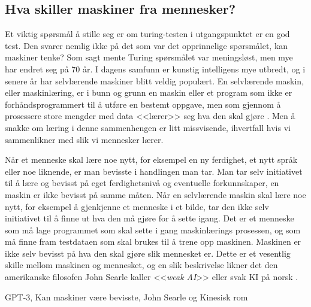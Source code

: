 \subsection{Hva skiller maskiner fra mennesker?}

Et viktig spørsmål å stille seg er om turing-testen i utgangspunktet er en god test. 
Den svarer nemlig ikke på det som var det opprinnelige spørsmålet, kan maskiner tenke? 
Som sagt mente Turing spørsmålet var meningsløst, men mye har endret seg på 70 år. 
I dagens samfunn er kunstig intelligens mye utbredt, og i senere år har selvlærende maskiner blitt veldig populært.
En selvlærende maskin, eller maskinlæring, er i bunn og grunn en maskin eller et program som ikke er forhåndsprogrammert til å utføre en bestemt oppgave, 
men som gjennom å prosessere store mengder med data <<lærer>> seg hva den skal gjøre \autocite[3]{Kiran2013}. Men å snakke om læring i denne sammenhengen er litt missvisende, ihvertfall hvis vi sammenlikner med slik vi mennesker lærer. 

Når et menneske skal lære noe nytt, for eksempel en ny ferdighet, et nytt språk eller noe liknende, er man bevisste i handlingen man tar. 
Man tar selv initiativet til å lære og bevisst på eget ferdighetsnivå og eventuelle forkunnskaper, en maskin er ikke bevisst på samme måten. 
Når en selvlærende maskin skal lære noe nytt, for eksempel å gjenkjenne et menneske i et bilde, tar den ikke selv initiativet til å finne ut hva den må gjøre for å sette igang. 
Det er et menneske som må lage programmet som skal sette i gang maskinlærings prosessen, 
og som må finne fram testdataen som skal brukes til å trene opp maskinen. 
Maskinen er ikke selv bevisst på hva den skal gjøre slik mennesket er. 
Dette er et vesentlig skille mellom maskinen og mennesket, 
og en slik beskrivelse likner det den amerikanske filosofen John Searle kaller <<\textit{weak AI}>> eller svak KI på norsk \autocite[9]{Kiran2013}.

GPT-3, Kan maskiner være bevisste,
John Searle og Kinesisk rom
